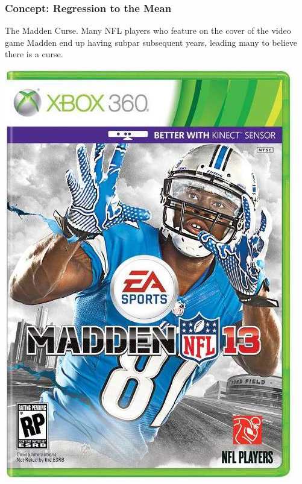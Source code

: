 \documentclass[slides]{beamer}
\begin{document}
\begin{frame}[fragile]
\frametitle{Concept: Regression to the Mean}

The Madden Curse.  Many NFL players who feature on the cover of the video game Madden end up having subpar subsequent years, leading many to believe there is a curse.

\begin{center}
\includegraphics[height=0.7\textheight]{figure/MaddenCurse.jpg}
\end{center}


\end{frame}
\end{document}
